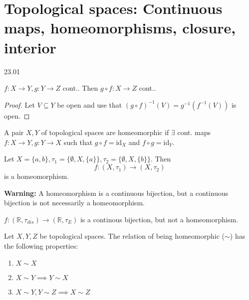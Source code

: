 \section{Topological spaces: Continuous maps, homeomorphisms, closure, interior}
23.01

\begin{proposition}
   \( f: X \to Y, g: Y \to Z \) cont.. Then \( g \circ f:X \to Z \) cont..
\end{proposition}

\begin{proof}
    Let \( V \subseteq Y \) be open
    and use that \( {(g \circ f)}^{-1} (V) = {g}^{-1} ({f}^{-1} (V)) \) is open.
\end{proof}

\begin{definition}
   A pair \( X, Y \) of topological spaces are homeomorphic
   if \( \exists \) cont. maps \( f: X \to Y, g: Y \to X \) such that
   \( g \circ f = \text{id}_X \) and \( f \circ g = \text{id}_Y \).
\end{definition}

\begin{example}
    Let \( X = \{ a, b \},
    \tau_1 = \{ \emptyset, X, \{ a  \} \},
    \tau_2 = \{ \emptyset, X, \{ b  \} \}
    \).
    Then
\[
  f: (X, \tau_1) \to (X, \tau_2)
\]
    is
    a homeomorphism.
\end{example}

\textbf{Warning:} A homeomorphism is a continuous bijection,
but a continuous bijection is not necessarily a homeomorphism.

\begin{nonexample}
  \( f: (\mathbb{R}, \tau_{dis}) \to (\mathbb{R}, \tau_{E}) \)
  is a continous bijection, but not a homeomorphism.
\end{nonexample}

\begin{theorem}
   Let \( X, Y, Z \) be topological spaces.
   The relation of being homeomorphic (\( \sim \)) has the following properties:

   \begin{enumerate}
     \item \( X \sim X \)
     \item \( X \sim Y \implies Y \sim X \)
     \item \( X \sim Y, Y \sim Z \implies X \sim Z \)
   \end{enumerate}
\end{theorem}

